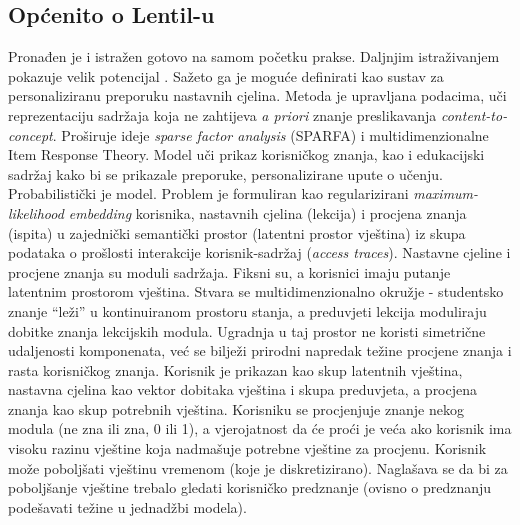 \subsection{Općenito o Lentil-u}
Pronađen je i istražen gotovo na samom početku prakse. Daljnjim istraživanjem pokazuje velik potencijal \citep{lentil}. Sažeto ga je moguće definirati kao sustav za personaliziranu preporuku nastavnih cjelina. Metoda je upravljana podacima, uči reprezentaciju sadržaja koja ne zahtijeva \textit{a priori} znanje preslikavanja \textit{content-to-concept}. Proširuje ideje \textit{sparse factor analysis} (SPARFA) i multidimenzionalne Item Response Theory.\newline
Model uči prikaz korisničkog znanja, kao i edukacijski sadržaj kako bi se prikazale preporuke, personalizirane upute o učenju. Probabilistički je model. Problem je formuliran kao regularizirani \textit{maximum-likelihood embedding} korisnika, nastavnih cjelina (lekcija) i procjena znanja (ispita) u zajednički semantički prostor (latentni prostor vještina) iz skupa podataka o prošlosti interakcije korisnik-sadržaj (\textit{access traces}). Nastavne cjeline i procjene znanja su moduli sadržaja. Fiksni su, a korisnici imaju putanje latentnim prostorom vještina. Stvara se multidimenzionalno okružje - studentsko znanje “leži” u kontinuiranom prostoru stanja, a preduvjeti lekcija moduliraju dobitke znanja lekcijskih modula. Ugradnja u taj prostor ne koristi simetrične udaljenosti komponenata, već se bilježi prirodni napredak težine procjene znanja i rasta korisničkog znanja.\newline
Korisnik je prikazan kao skup latentnih vještina, nastavna cjelina kao vektor dobitaka vještina i skupa preduvjeta, a procjena znanja kao skup potrebnih vještina. Korisniku se procjenjuje znanje nekog modula (ne zna ili zna, 0 ili 1), a vjerojatnost da će proći je veća ako korisnik ima visoku razinu vještine koja nadmašuje potrebne vještine za procjenu. Korisnik može poboljšati vještinu vremenom (koje je diskretizirano). Naglašava se da bi za poboljšanje vještine trebalo gledati korisničko predznanje (ovisno o predznanju podešavati težine u jednadžbi modela). 

